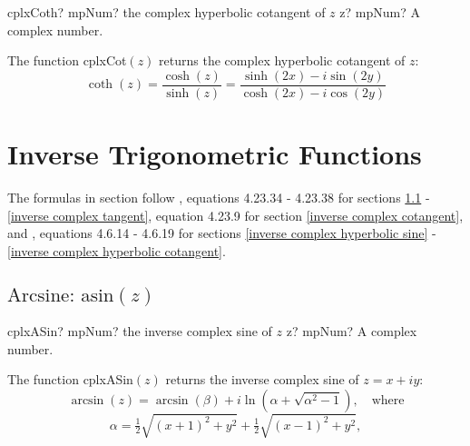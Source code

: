 \begin{mpFunctionsExtract}
	\mpFunctionOne
	{cplxCoth? mpNum? the complex hyperbolic cotangent of $z$}
	{z? mpNum? A complex number.}
\end{mpFunctionsExtract}

\vspace{0.3cm}
The function \textsf{cplxCot$(z)$} returns the complex hyperbolic cotangent of $z$: 
\begin{equation}
	\coth(z) =\frac{\cosh(z)}{\sinh(z)} = \frac{\sinh(2x)-i \sin(2y)}{\cosh(2x)-i \cos(2y)}
\end{equation}









\section{Inverse Trigonometric Functions}
\label{InverseTrigonometricFunctionsCplx}

The formulas in section follow \cite{NIST}, equations 4.23.34 - 4.23.38 for sections \ref{inverse complex sine} - \ref{inverse complex tangent}, equation 4.23.9 for section \ref{inverse complex cotangent}, and \cite{abramowitz_handbook_1970}, equations 4.6.14 - 4.6.19 for sections \ref{inverse complex hyperbolic sine} - \ref{inverse complex hyperbolic cotangent}.

\subsection{\texorpdfstring{$\text{Arcsine: asin}(z)$}{asin}}
\label{inverse complex sine}

\begin{mpFunctionsExtract}
	\mpFunctionOne
	{cplxASin? mpNum? the inverse complex sine of $z$}
	{z? mpNum? A complex number.}
\end{mpFunctionsExtract}

\vspace{0.3cm}
The function \textsf{cplxASin$(z)$} returns the inverse complex sine of $z=x+iy$: 
\begin{equation}
	\arcsin(z) = \arcsin(\beta) + i \ln \left(\alpha + \sqrt{\alpha^2 -1}\right), \quad \text{where}
\end{equation}
\begin{equation}
	\label{complexAlpha}
	\alpha = \tfrac{1}{2} \sqrt{(x+1)^2 + y^2} + \tfrac{1}{2} \sqrt{(x-1)^2 + y^2},
\end{equation}

